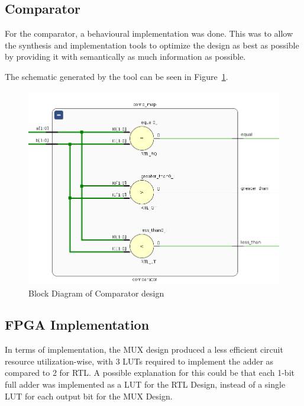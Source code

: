 \documentclass{article}
\begin{document}
\subsection{Comparator}

For the comparator, a behavioural implementation was done. This was to allow the synthesis and implementation tools to
optimize the design as best as possible by providing it with semantically as much information as possible.

The schematic generated by the tool can be seen in Figure~\ref{fig:comp-schematic}.

\begin{figure}[h]
    \centering
    \includegraphics[width=0.6\linewidth]{comp-schematic.png}
    \caption{Block Diagram of Comparator design}
    \label{fig:comp-schematic}
\end{figure}

\pagebreak

\subsection{FPGA Implementation}

In terms of implementation, the MUX design produced a less efficient circuit resource utilization-wise,
with 3 LUTs required to implement the adder as compared to 2 for RTL.\@
A possible explanation for this could be that each 1-bit full adder was implemented as a LUT for the RTL Design,
instead of a single LUT for each output bit for the MUX Design.
\end{document}
